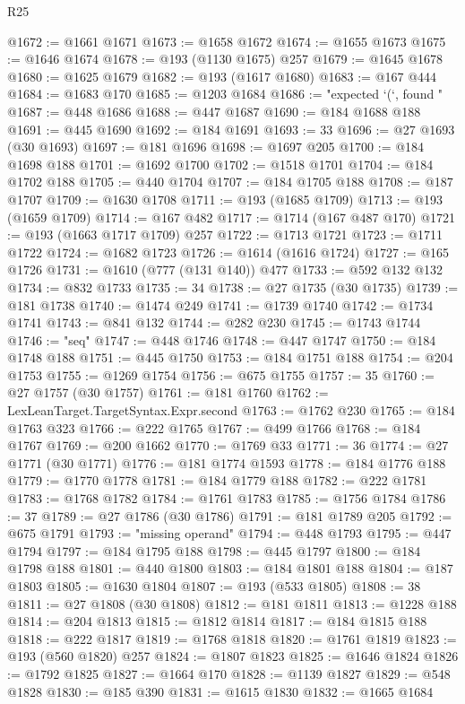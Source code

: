 \begin{lexlean}{R25}
\begin{coremodule}
@1672 := @1661 @1671
@1673 := @1658 @1672
@1674 := @1655 @1673
@1675 := @1646 @1674
@1678 := @193 (@1130 @1675) @257
@1679 := @1645 @1678
@1680 := @1625 @1679
@1682 := @193 (@1617 @1680)
@1683 := @167 @444
@1684 := @1683 @170
@1685 := @1203 @1684
@1686 := "expected `(`, found "
@1687 := @448 @1686
@1688 := @447 @1687
@1690 := @184 @1688 @188
@1691 := @445 @1690
@1692 := @184 @1691
@1693 := 33
@1696 := @27 @1693 (@30 @1693)
@1697 := @181 @1696
@1698 := @1697 @205
@1700 := @184 @1698 @188
@1701 := @1692 @1700
@1702 := @1518 @1701
@1704 := @184 @1702 @188
@1705 := @440 @1704
@1707 := @184 @1705 @188
@1708 := @187 @1707
@1709 := @1630 @1708
@1711 := @193 (@1685 @1709)
@1713 := @193 (@1659 @1709)
@1714 := @167 @482
@1717 := @1714 (@167 @487 @170)
@1721 := @193 (@1663 @1717 @1709) @257
@1722 := @1713 @1721
@1723 := @1711 @1722
@1724 := @1682 @1723
@1726 := @1614 (@1616 @1724)
@1727 := @165 @1726
@1731 := @1610 (@777 (@131 @140)) @477
@1733 := @592 @132 @132
@1734 := @832 @1733
@1735 := 34
@1738 := @27 @1735 (@30 @1735)
@1739 := @181 @1738
@1740 := @1474 @249
@1741 := @1739 @1740
@1742 := @1734 @1741
@1743 := @841 @132
@1744 := @282 @230
@1745 := @1743 @1744
@1746 := "seq"
@1747 := @448 @1746
@1748 := @447 @1747
@1750 := @184 @1748 @188
@1751 := @445 @1750
@1753 := @184 @1751 @188
@1754 := @204 @1753
@1755 := @1269 @1754
@1756 := @675 @1755
@1757 := 35
@1760 := @27 @1757 (@30 @1757)
@1761 := @181 @1760
@1762 := LexLeanTarget.TargetSyntax.Expr.second
@1763 := @1762 @230
@1765 := @184 @1763 @323
@1766 := @222 @1765
@1767 := @499 @1766
@1768 := @184 @1767
@1769 := @200 @1662
@1770 := @1769 @33
@1771 := 36
@1774 := @27 @1771 (@30 @1771)
@1776 := @181 @1774 @1593
@1778 := @184 @1776 @188
@1779 := @1770 @1778
@1781 := @184 @1779 @188
@1782 := @222 @1781
@1783 := @1768 @1782
@1784 := @1761 @1783
@1785 := @1756 @1784
@1786 := 37
@1789 := @27 @1786 (@30 @1786)
@1791 := @181 @1789 @205
@1792 := @675 @1791
@1793 := "missing operand"
@1794 := @448 @1793
@1795 := @447 @1794
@1797 := @184 @1795 @188
@1798 := @445 @1797
@1800 := @184 @1798 @188
@1801 := @440 @1800
@1803 := @184 @1801 @188
@1804 := @187 @1803
@1805 := @1630 @1804
@1807 := @193 (@533 @1805)
@1808 := 38
@1811 := @27 @1808 (@30 @1808)
@1812 := @181 @1811
@1813 := @1228 @188
@1814 := @204 @1813
@1815 := @1812 @1814
@1817 := @184 @1815 @188
@1818 := @222 @1817
@1819 := @1768 @1818
@1820 := @1761 @1819
@1823 := @193 (@560 @1820) @257
@1824 := @1807 @1823
@1825 := @1646 @1824
@1826 := @1792 @1825
@1827 := @1664 @170
@1828 := @1139 @1827
@1829 := @548 @1828
@1830 := @185 @390
@1831 := @1615 @1830
@1832 := @1665 @1684

\end{coremodule}
\end{lexlean}
